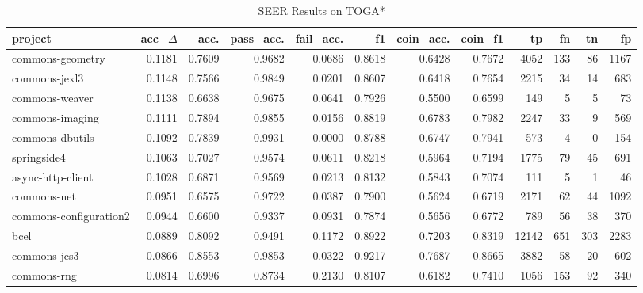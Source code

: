 \begin{table*}
\centering
\caption{SEER Results on TOGA*}
\label{tab:toga_results_all}
\begin{tabular}{lrrrrrrrrrrr}
\toprule
                project &  acc\_$\Delta$ &    acc. &  pass\_acc. &  fail\_acc. &      f1 &  coin\_acc. &  coin\_f1 &      tp &    fn &    tn &     fp \\
\midrule
       commons-geometry &      0.1181 &  0.7609 &     0.9682 &     0.0686 &  0.8618 &     0.6428 &   0.7672 &    4052 &   133 &    86 &   1167 \\
          commons-jexl3 &      0.1148 &  0.7566 &     0.9849 &     0.0201 &  0.8607 &     0.6418 &   0.7654 &    2215 &    34 &    14 &    683 \\
         commons-weaver &      0.1138 &  0.6638 &     0.9675 &     0.0641 &  0.7926 &     0.5500 &   0.6599 &     149 &     5 &     5 &     73 \\
        commons-imaging &      0.1111 &  0.7894 &     0.9855 &     0.0156 &  0.8819 &     0.6783 &   0.7982 &    2247 &    33 &     9 &    569 \\
        commons-dbutils &      0.1092 &  0.7839 &     0.9931 &     0.0000 &  0.8788 &     0.6747 &   0.7941 &     573 &     4 &     0 &    154 \\
            springside4 &      0.1063 &  0.7027 &     0.9574 &     0.0611 &  0.8218 &     0.5964 &   0.7194 &    1775 &    79 &    45 &    691 \\
      async-http-client &      0.1028 &  0.6871 &     0.9569 &     0.0213 &  0.8132 &     0.5843 &   0.7074 &     111 &     5 &     1 &     46 \\
            commons-net &      0.0951 &  0.6575 &     0.9722 &     0.0387 &  0.7900 &     0.5624 &   0.6719 &    2171 &    62 &    44 &   1092 \\
 commons-configuration2 &      0.0944 &  0.6600 &     0.9337 &     0.0931 &  0.7874 &     0.5656 &   0.6772 &     789 &    56 &    38 &    370 \\
                   bcel &      0.0889 &  0.8092 &     0.9491 &     0.1172 &  0.8922 &     0.7203 &   0.8319 &   12142 &   651 &   303 &   2283 \\
           commons-jcs3 &      0.0866 &  0.8553 &     0.9853 &     0.0322 &  0.9217 &     0.7687 &   0.8665 &    3882 &    58 &    20 &    602 \\
            commons-rng &      0.0814 &  0.6996 &     0.8734 &     0.2130 &  0.8107 &     0.6182 &   0.7410 &    1056 &   153 &    92 &    340 \\

\end{tabular}
\end{table*}

